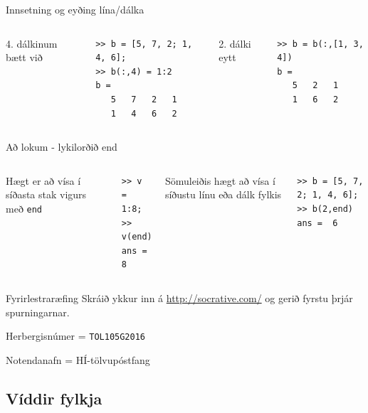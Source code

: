 \documentclass[handout]{beamer}
\begin{document}
\begin{frame}[fragile]{Innsetning og eyðing lína/dálka}
\begin{columns}
4. dálkinum bætt við
\begin{verbatim}
>> b = [5, 7, 2; 1, 4, 6];
>> b(:,4) = 1:2
b =
   5   7   2   1
   1   4   6   2
\end{verbatim}
2. dálki eytt
\begin{verbatim}
>> b = b(:,[1, 3, 4])
b =
   5   2   1
   1   6   2
\end{verbatim}
\vspace{\baselineskip}
\end{columns}
\end{frame}

\begin{frame}[fragile]{Að lokum - lykilorðið end}
\begin{columns}
Hægt er að vísa í síðasta stak vigurs með \texttt{end}
\begin{verbatim}
>> v = 1:8;
>> v(end)
ans =  8
\end{verbatim}
Sömuleiðis hægt að vísa í síðustu línu eða dálk fylkis
\begin{verbatim}
>> b = [5, 7, 2; 1, 4, 6];
>> b(2,end)
ans =  6
\end{verbatim}
\end{columns}
\end{frame}

\begin{frame}{Fyrirlestraræfing}
Skráið ykkur inn á \url{http://socrative.com/} og gerið fyrstu þrjár spurningarnar.

Herbergisnúmer = \texttt{TOL105G2016}

Notendanafn = HÍ-tölvupóstfang
\end{frame}

\subsection{Víddir fylkja}
\end{document}

